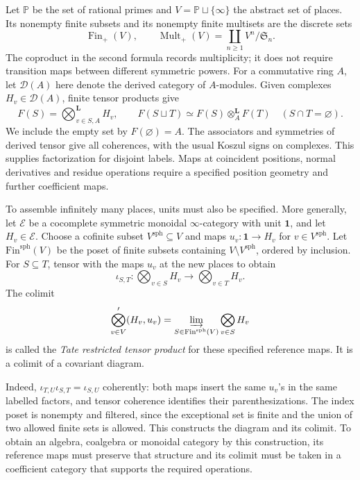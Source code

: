 Let \(\mathbb P\) be the set of rational primes and
\(V=\mathbb P\sqcup\{\infty\}\) the abstract set of places.
Its nonempty finite subsets and its nonempty finite multisets are
the discrete sets
\[
 \operatorname{Fin}_{+}(V),\qquad
 \operatorname{Mult}_{+}(V)=\coprod_{n\ge1}V^n/\mathfrak S_n.
\]
The coproduct in the second formula records multiplicity; it
does not require transition maps between different symmetric powers.
For a commutative ring \(A\), let \(\mathcal D(A)\) here denote
the derived category of \(A\)-modules. Given complexes
\(H_v\in\mathcal D(A)\), finite tensor products give
\begin{equation}\label{v4-eq:word-discrete-factorization}
 F(S)=\bigotimes_{v\in S,A}^{\mathbf L}H_v,\qquad
 F(S\sqcup T)\simeq F(S)\otimes_A^{\mathbf L}F(T)
                         \quad(S\cap T=\varnothing).
\end{equation}
We include the empty set by \(F(\varnothing)=A\).
The associators and symmetries of derived tensor give all
coherences, with the usual Koszul signs on complexes. This supplies
factorization for disjoint labels. Maps at coincident positions,
normal derivatives and residue operations require a specified
position geometry and further coefficient maps.

To assemble infinitely many places, units must also be specified.
More generally, let \(\mathcal E\) be a cocomplete symmetric monoidal
\(\infty\)-category with unit \(\mathbf1\), and let \(H_v\in\mathcal E\).
Choose a cofinite subset \(V^{\mathrm{sph}}\subseteq V\) and maps
\(u_v:\mathbf1\to H_v\) for \(v\in V^{\mathrm{sph}}\).
Let \(\mathrm{Fin}^{\mathrm{sph}}(V)\) be the poset of finite
subsets containing \(V\setminus V^{\mathrm{sph}}\), ordered by inclusion.
For \(S\subseteq T\), tensor with the maps \(u_v\) at the new
places to obtain
\[
 \iota_{S,T}:\bigotimes_{v\in S}H_v
           \longrightarrow\bigotimes_{v\in T}H_v.
\]
The colimit
\begin{equation}\label{v4-eq:word-restricted-tensor}
 \bigotimes_{v\in V}'(H_v,u_v)
   =\varinjlim_{S\in\mathrm{Fin}^{\mathrm{sph}}(V)}
                                      \bigotimes_{v\in S}H_v
\end{equation}
is called the \emph{Tate restricted tensor product} for these
specified reference maps. It is a colimit of a covariant diagram.

Indeed, \(\iota_{T,U}\iota_{S,T}=\iota_{S,U}\) coherently:
both maps insert the same \(u_v\)'s in the same labelled factors,
and tensor coherence identifies their parenthesizations. The
index poset is nonempty and filtered, since the exceptional set
is finite and the union of two allowed finite sets is allowed.
This constructs the diagram and its colimit. To obtain an algebra,
coalgebra or monoidal category by this construction, its reference
maps must preserve that structure and its colimit must be taken
in a coefficient category that supports the required operations.

